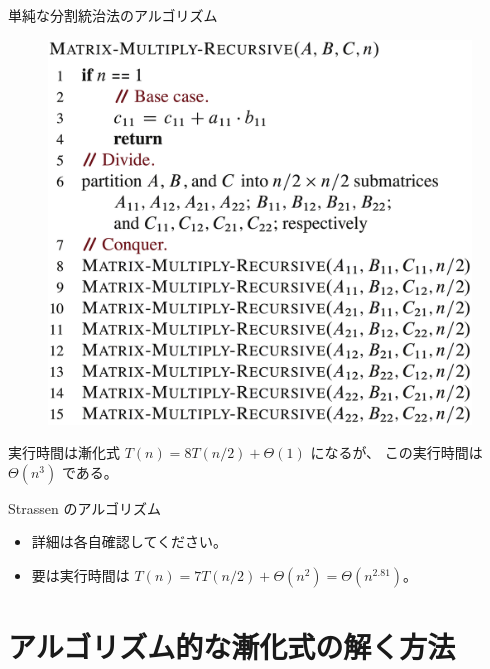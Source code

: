 \documentclass[unicode,11pt,aspectratio=169,notes]{beamer} %
\begin{document}
\begin{frame}{単純な分割統治法のアルゴリズム}
  \begin{figure}
    \includegraphics[height=0.60\textheight]{../resources/pseudo-04-02}
  \end{figure}
  実行時間は漸化式 $T(n) = 8T(n/2) + \Theta(1)$ になるが、
  この実行時間は $\Theta(n^3)$ である。
\end{frame}


\begin{frame}{Strassen のアルゴリズム}
  \begin{itemize}
    \item 詳細は各自確認してください。
    \item 要は実行時間は $T(n) = 7T(n/2) + \Theta(n^2) = \Theta(n^{2.81})$。
  \end{itemize}
\end{frame}


\section*{アルゴリズム的な漸化式の解く方法}
\end{document}
